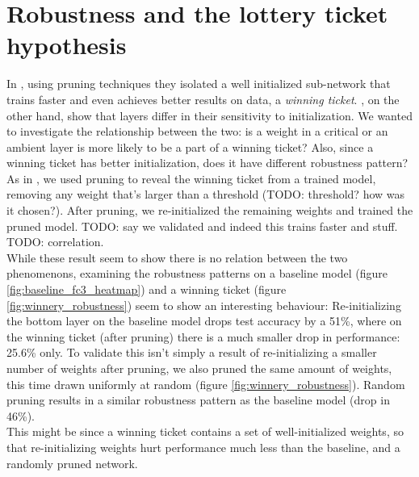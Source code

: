 \documentclass{article}
\begin{document}
\section{Robustness and the lottery ticket hypothesis} \label{winnerySection}
    
In \cite{frankle2018lottery}, using pruning techniques they isolated a well initialized sub-network that trains faster and even achieves better results on data, a \emph{winning ticket}. \cite{allLayers}, on the other hand, show that layers differ in their sensitivity to initialization. We wanted to investigate the relationship between the two: is a weight in a critical or an ambient layer is more likely to be a part of a winning ticket? Also, since a winning ticket has better initialization, does it have different robustness pattern? \\
As in \cite{frankle2018lottery}, we used pruning to reveal the winning ticket from a trained model, removing any weight that's larger than a threshold (TODO: threshold? how was it chosen?). After pruning, we re-initialized the remaining weights and trained the pruned model. TODO: say we validated and indeed this trains faster and stuff.\\
TODO: correlation.\\
While these result seem to show there is no relation between the two phenomenons, examining the robustness patterns on a baseline model (figure \ref{fig:baseline_fc3_heatmap}) and a winning ticket (figure \ref{fig:winnery_robustness}) seem to show an interesting behaviour: Re-initializing the bottom layer on the baseline model drops test accuracy by a 51\%, where on the winning ticket (after pruning) there is a much smaller drop in performance: 25.6\% only. To validate this isn't simply a result of re-initializing a smaller number of weights after pruning, we also pruned the same amount of weights, this time drawn uniformly at random (figure \ref{fig:winnery_robustness}). Random pruning results in a similar robustness pattern as the baseline model (drop in 46\%).\\
This might be since a winning ticket contains a set of well-initialized weights, so that re-initializing weights hurt performance much less than the baseline, and a randomly pruned network.
\end{document}
